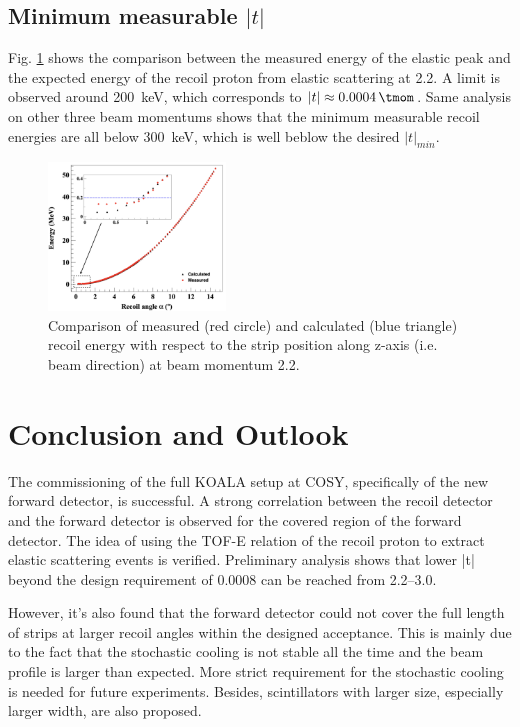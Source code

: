 \documentclass[number,5p]{elsarticle}
\begin{document}
\subsection{Minimum measurable $|t|$}
\label{minimum_t}

Fig. \ref{fig:measured_vs_calculated} shows the comparison between the measured
energy of the elastic peak and the expected energy of the recoil proton from elastic scattering at \SI{2.2}{\momentum}.
A limit is observed around \SI{200}{\keV}, which corresponds to $|t| \approx  \SI{0.0004}{\tmom}$.
Same analysis on other three beam momentums shows that the minimum measurable
recoil energies are all below \SI{300}{\keV}, which is well beblow the desired $|t|_{min}$.

\begin{figure}[h!]
  \centering
  \includegraphics[width=0.42\textwidth]{./calc_vs_measured_2.2_angle_combined.png}
  \caption{
    Comparison of measured (red circle) and calculated (blue triangle) recoil energy with respect to the strip position along z-axis (i.e. beam direction) at beam momentum \SI{2.2}{\momentum}.}
  \label{fig:measured_vs_calculated}
\end{figure}


\section{Conclusion and Outlook}
\label{sec:conclusion}

The commissioning of the full KOALA setup at COSY, specifically of the new forward detector, is successful.
A strong correlation between the recoil detector and the forward detector is
observed for the covered region of the forward detector.
The idea of using the TOF-E relation of the recoil proton to extract elastic
scattering events is verified.
Preliminary analysis shows that lower |t| beyond the design requirement of \SI{0.0008}{\tmom} can be reached from \SIrange{2.2}{3.0}{\momentum}. 

However, it's also found that the forward detector could not cover the full
length of strips at larger recoil angles within the designed acceptance.
This is mainly due to the fact that the stochastic cooling is not stable all the time
and the beam profile is larger than expected.
More strict requirement for the stochastic cooling is needed for future experiments.
Besides, scintillators with larger size, especially larger width, are also proposed.
\end{document}
